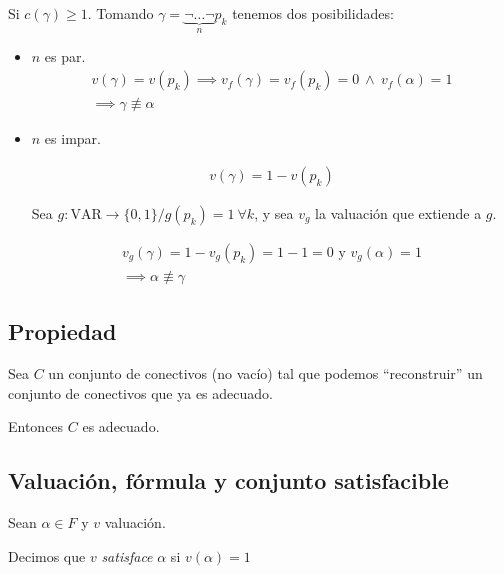 \begin{enumerate}
        Si $c(\gamma) \geq 1$. 
        Tomando $\gamma = \underbrace{\neg \dots \neg}_{n} p_k$ tenemos
        dos posibilidades:
        \begin{itemize}
            \item $n$ es par.
                \begin{gather*}
                    v(\gamma) = v(p_k) 
                    \implies 
                    v_f(\gamma) = v_f(p_k) = 0 
                    ~ \wedge ~
                    v_f(\alpha) = 1 \\
                    \implies \gamma \not\equiv \alpha
                \end{gather*}
            \item $n$ es impar.

                \begin{gather*}
                    v(\gamma) = 1 - v(p_k) 
                \end{gather*}

                Sea 
                $g: \mathrm{VAR} \to \{ 0, 1 \} / g(p_k) = 1 ~ \forall k$,
                y sea $v_g$ la valuación que extiende a $g$.

                \begin{gather*}
                    v_g(\gamma) = 1 - v_g(p_k) = 1 - 1 = 0 
                    \text{ y }
                    v_g(\alpha) = 1 \\
                    \implies \alpha \not\equiv \gamma
                \end{gather*}
        \end{itemize}
\end{enumerate}

\subsection{Propiedad}

Sea $C$ un conjunto de conectivos (no vacío) tal que podemos ``reconstruir''
un conjunto de conectivos que ya es adecuado.

Entonces $C$ es adecuado.

\subsection{Valuación, fórmula y conjunto satisfacible}

\begin{definicion}{}{}
    Sean $\alpha \in F$ y $v$ valuación.

    \medskip 

    Decimos que $v$ \textit{satisface} $\alpha$ si $v(\alpha)=1$
\end{definicion}


